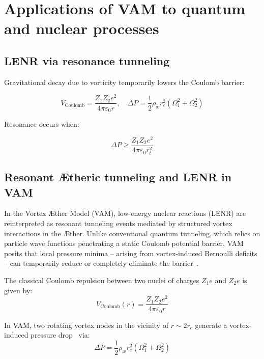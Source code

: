 \section{Applications of VAM to quantum and nuclear processes}
\label{sec:LENR_QED}
\subsection*{LENR via resonance tunneling}

Gravitational decay due to vorticity temporarily lowers the Coulomb barrier:

\begin{equation}
    V_\text{Coulomb} = \frac{Z_1 Z_2 e^2}{4\pi \varepsilon_0 r}, \quad \Delta P = \frac{1}{2} \rho_\text{\ae} r_c^2 (\Omega_1^2 + \Omega_2^2)
\end{equation}

Resonance occurs when:

\begin{equation}
    \Delta P \geq \frac{Z_1 Z_2 e^2}{4\pi \varepsilon_0 r_t^2}
\end{equation}

\subsection*{Resonant Ætheric tunneling and LENR in VAM}

In the Vortex Æther Model (VAM), low-energy nuclear reactions (LENR) are reinterpreted as resonant tunneling events mediated by structured vortex interactions in the Æther. Unlike conventional quantum tunneling, which relies on particle wave functions penetrating a static Coulomb potential barrier, VAM posits that local pressure minima – arising from vortex-induced Bernoulli deficits – can temporarily reduce or completely eliminate the barrier~\cite{Barcelo2011,Volovik2003}.

The classical Coulomb repulsion between two nuclei of charges \( Z_1 e \) and \( Z_2 e \) is given by:
\begin{equation}
    V_\text{Coulomb}(r) = \frac{Z_1 Z_2 e^2}{4\pi \varepsilon_0 r}
\end{equation}

In VAM, two rotating vortex nodes in the vicinity of \( r \sim 2r_c \) generate a vortex-induced pressure drop~\cite{Saffman1992} via:
\begin{equation}
    \Delta P = \frac{1}{2} \rho_\text{\ae} r_c^2 (\Omega_1^2 + \Omega_2^2)
\end{equation}

